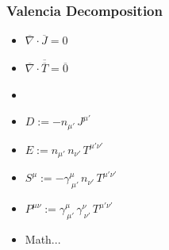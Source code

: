 \documentclass{beamer}
\newcommand{\ol}{\overline}
\begin{document}
\begin{frame}
\frametitle{Valencia Decomposition}

  \begin{itemize}
    \item[]
      $\ol{\nabla}\cdot\ol{J}=0$\\[1em]
    \item[]
      $\ol{\nabla}\cdot\ol{\ol{T}}=\ol{0}$
  \end{itemize}
  \begin{itemize}[<+->]
    \item[]
    \item[]
      $D:=-n_{\mu'}\,J^{\mu'}$\\[1em]
    \item[]
      $E:=n_{\mu'}\,n_{\nu'}\,T^{\mu'\nu'}$\\[1em]
    \item[]
      $S^{\mu}:=-\gamma^{\mu}_{~\mu'}\,n_{\nu'}\,T^{\mu'\nu'}$\\[1em]
    \item[]
      $P^{\mu\nu}:=\gamma^{\mu}_{~\mu'}\,\gamma^{\nu}_{~\nu'}\,
      T^{\mu'\nu'}$\\[1em]
    \item[]
      Math...
  \end{itemize}

\end{frame}
\end{document}
